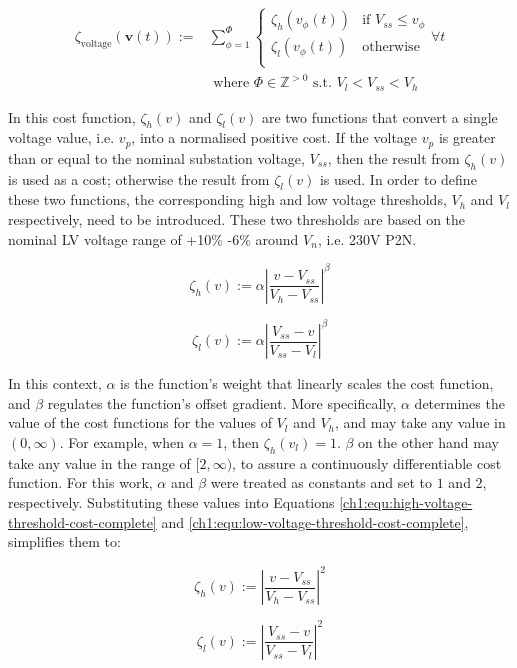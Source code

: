 \begin{equation}
\begin{split}
	\zeta_\text{voltage}(\textbf{v}(t)) :=& \sum_{\phi=1}^{\Phi}{\begin{cases}
		\zeta_h(v_{\phi}(t)) & \text{if } V_{ss} \leq v_\phi\\
		\zeta_l(v_{\phi}(t)) & \text{otherwise}\\
	\end{cases}} \forall t\\
	&\text{ where } \Phi \in \mathbb{Z}^{>0} \text{ s.t. } V_l < V_{ss} < V_h
\end{split}
\label{ch1:equ:voltage-deviation}
\end{equation}

In this cost function, $\zeta_h(v)$ and $\zeta_l(v)$ are two functions that convert a single voltage value, i.e. $v_p$, into a normalised positive cost.
If the voltage $v_p$ is greater than or equal to the nominal substation voltage, $V_{ss}$, then the result from $\zeta_h(v)$ is used as a cost; otherwise the result from $\zeta_l(v)$ is used.
In order to define these two functions, the corresponding high and low voltage thresholds, $V_h$ and $V_l$ respectively, need to be introduced.
These two thresholds are based on the nominal LV voltage range of +10\% -6\% around $V_n$, i.e. 230V P2N.

\begin{equation}
	\zeta_h(v) := \alpha \left|\frac{v-V_{ss}}{V_h-V_{ss}}\right|^{\beta}
	\label{ch1:equ:high-voltage-threshold-cost-complete}
\end{equation}

\begin{equation}
	\zeta_l(v) := \alpha \left|\frac{V_{ss}-v}{V_{ss}-V_l}\right|^{\beta}
	\label{ch1:equ:low-voltage-threshold-cost-complete}
\end{equation}

In this context, $\alpha$ is the function's weight that linearly scales the cost function, and $\beta$ regulates the function's offset gradient.
More specifically, $\alpha$ determines the value of the cost functions for the values of $V_l$ and $V_h$, and may take any value in $(0, \infty)$.
For example, when $\alpha = 1$, then $\zeta_{h}(v_l) = 1$.
$\beta$ on the other hand may take any value in the range of $[2, \infty)$, to assure a continuously differentiable cost function.
For this work, $\alpha$ and $\beta$ were treated as constants and set to $1$ and $2$, respectively.
Substituting these values into Equations \ref{ch1:equ:high-voltage-threshold-cost-complete} and \ref{ch1:equ:low-voltage-threshold-cost-complete}, simplifies them to:

\begin{equation}
	\zeta_h(v) := \left|\frac{v-V_{ss}}{V_h-V_{ss}}\right|^{2}
	\label{ch1:equ:high-voltage-threshold-cost-simple}
\end{equation}

\begin{equation}
	\zeta_l(v) := \left|\frac{V_{ss}-v}{V_{ss}-V_l}\right|^{2}
	\label{ch1:equ:low-voltage-threshold-cost-simple}
\end{equation}
